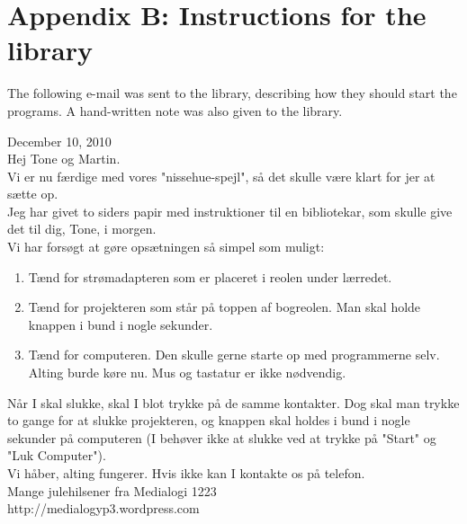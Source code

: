 \chapter{Appendix B: Instructions for the library}
The following e-mail was sent to the library, describing how they should start the programs. A hand-written note was also given to the library.

\begin{fancyquotes}
December 10, 2010\\
Hej Tone og Martin.\\

Vi er nu f{\ae}rdige med vores "nissehue-spejl", s{\aa} det skulle v{\ae}re klart for jer at s{\ae}tte op.\\

Jeg har givet to siders papir med instruktioner til en bibliotekar, som skulle give det til dig, Tone, i morgen.\\

Vi har fors{\o}gt at g{\o}re ops{\ae}tningen s{\aa} simpel som muligt:\\

\begin{enumerate}
\item T{\ae}nd for str{\o}madapteren som er placeret i reolen under l{\ae}rredet.
\item T{\ae}nd for projekteren som st{\aa}r p{\aa} toppen af bogreolen. Man skal holde knappen i bund i nogle sekunder.
\item T{\ae}nd for computeren. Den skulle gerne starte op med programmerne selv. Alting burde k{\o}re nu. Mus og tastatur er ikke n{\o}dvendig.
\end{enumerate}

N{\aa}r I skal slukke, skal I blot trykke p{\aa} de samme kontakter. Dog skal man trykke to gange for at slukke projekteren, og knappen skal holdes i bund i nogle sekunder p{\aa} computeren (I beh{\o}ver ikke at slukke ved at trykke p{\aa} "Start" og "Luk Computer").\\

Vi h{\aa}ber, alting fungerer. Hvis ikke kan I kontakte os p{\aa} telefon.\\

Mange julehilsener fra Medialogi 1223\\
http://medialogyp3.wordpress.com\end{fancyquotes}
